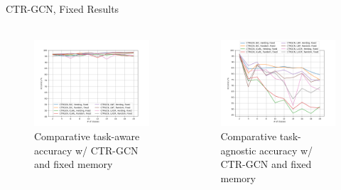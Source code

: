 \documentclass[aspectratio=169, xcolor=dvipsnames]{beamer}
\begin{document}
\begin{frame}{CTR-GCN, Fixed Results}
      \framesubtitle{}%
      
      \begin{columns}
      \begin{figure}[ht!]
            \centering
            \includegraphics[width=\textwidth]{images/ctrgcn_fixed_TAw_Acc.png}
            \caption{Comparative task-aware accuracy w/ CTR-GCN  and fixed memory}
      \end{figure}
      
      \begin{figure}[ht!]
            \centering
            \includegraphics[width=\textwidth]{images/ctrgcn_fixed_TAg_Acc.png}
            \caption{Comparative task-agnostic accuracy w/ CTR-GCN  and fixed memory}
      \end{figure} 
      \end{columns}
\end{frame}
\end{document}
